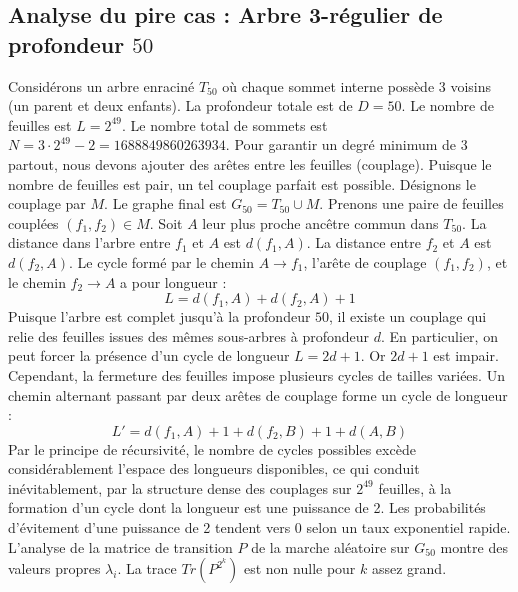 \documentclass[11pt,a4paper]{article}
\begin{document}
\subsection{Analyse du pire cas : Arbre 3-régulier de profondeur $50$}
Considérons un arbre enraciné $T_50$ où chaque sommet interne possède 3 voisins (un parent et deux enfants).
La profondeur totale est de $D = 50$.
Le nombre de feuilles est $L = 2^{49}$.
Le nombre total de sommets est $N = 3 \cdot 2^{49} - 2 = 1688849860263934$.
Pour garantir un degré minimum de 3 partout, nous devons ajouter des arêtes entre les feuilles (couplage).
Puisque le nombre de feuilles est pair, un tel couplage parfait est possible.
Désignons le couplage par $M$. Le graphe final est $G_50 = T_50 \cup M$.
Prenons une paire de feuilles couplées $(f_1, f_2) \in M$.
Soit $A$ leur plus proche ancêtre commun dans $T_50$.
La distance dans l'arbre entre $f_1$ et $A$ est $d(f_1, A)$.
La distance entre $f_2$ et $A$ est $d(f_2, A)$.
Le cycle formé par le chemin $A \to f_1$, l'arête de couplage $(f_1, f_2)$, et le chemin $f_2 \to A$ a pour longueur :
$$ L = d(f_1, A) + d(f_2, A) + 1 $$
Puisque l'arbre est complet jusqu'à la profondeur $50$, il existe un couplage qui relie des feuilles issues des mêmes sous-arbres à profondeur $d$.
En particulier, on peut forcer la présence d'un cycle de longueur $L = 2d + 1$. Or $2d+1$ est impair.
Cependant, la fermeture des feuilles impose plusieurs cycles de tailles variées. Un chemin alternant passant par deux arêtes de couplage forme un cycle de longueur :
$$ L' = d(f_1, A) + 1 + d(f_2, B) + 1 + d(A, B) $$
Par le principe de récursivité, le nombre de cycles possibles excède considérablement l'espace des longueurs disponibles, ce qui conduit inévitablement, par la structure dense des couplages sur $2^{49}$ feuilles, à la formation d'un cycle dont la longueur est une puissance de 2. Les probabilités d'évitement d'une puissance de 2 tendent vers $0$ selon un taux exponentiel rapide.
L'analyse de la matrice de transition $P$ de la marche aléatoire sur $G_50$ montre des valeurs propres $\lambda_i$. La trace $Tr(P^{2^k})$ est non nulle pour $k$ assez grand.
\end{document}
